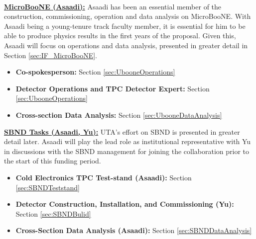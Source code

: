 
\newline \\
\noindent \underline{\textbf{MicroBooNE (Asaadi):}} Asaadi has been an essential member of the construction, commissioning, operation and data analysis on MicroBooNE. With Asaadi being a young-tenure track faculty member, it is essential for him to be able to produce physics results in the first years of the proposal. Given this, Asaadi will focus on operations and data analysis, presented in greater detail in Section \ref{sec:IF_MicroBooNE}.
\begin{itemize}
\item{\textbf{Co-spokesperson:}} Section \ref{sec:UbooneOperations}
\item{\textbf{Detector Operations and TPC Detector Expert:}} Section \ref{sec:UbooneOperations}
\item{\textbf{Cross-section Data Analysis:}} Section \ref{sec:UbooneDataAnalysis}
\end{itemize}

\noindent \underline{\textbf{SBND Tasks (Asaadi, Yu):}}  UTA's effort on SBND is presented in greater detail later. Asaadi will play the lead role as institutional representative with Yu in discussions with the SBND management for joining the collaboration prior to the start of this funding period.
\begin{itemize}
\item{\textbf{Cold Electronics TPC Test-stand (Asaadi):}} Section \ref{sec:SBNDTeststand}
\item{\textbf{Detector Construction, Installation, and Commissioning (Yu):}} Section \ref{sec:SBNDBulid}
\item{\textbf{Cross-Section Data Analysis (Asaadi):}} Section \ref{sec:SBNDDataAnalysis}
\end{itemize}

